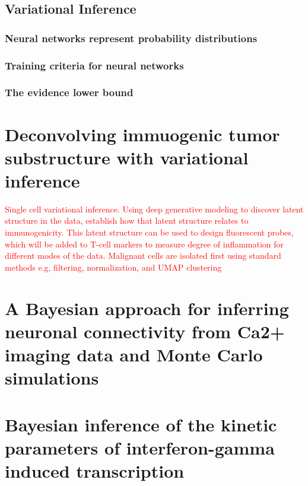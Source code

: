 \documentclass{ucetd}
\begin{document}
\section{Variational Inference}


\subsection{Neural networks represent probability distributions}

\subsection{Training criteria for neural networks}

\subsection{The evidence lower bound}

\chapter{Deconvolving immuogenic tumor substructure with variational inference}

\textcolor{red}{Single cell variational inference. Using deep generative modeling to discover latent structure in the data, establish how that latent structure relates to immunogenicity. This latent structure can be used to design fluorescent probes, which will be added to T-cell markers to measure degree of inflammation for different modes of the data. Malignant cells are isolated first using standard methods e.g, filtering, normalization, and UMAP clustering}

\chapter{A Bayesian approach for inferring neuronal connectivity from Ca2+ imaging data and Monte Carlo simulations}

\chapter{Bayesian inference of the kinetic parameters of interferon-gamma induced transcription}


\makebibliography
\end{document}
